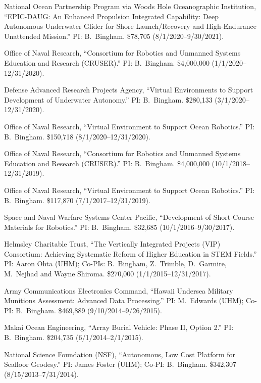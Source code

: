 
\begin{cvenum}
  \item National Ocean Partnership Program via Woods Hole Oceanographic Institution, ``EPIC-DAUG: An Enhanced Propulsion Integrated Capability: Deep Autonomous Underwater Glider for Shore Launch/Recovery and High-Endurance Unattended Mission.'' PI: B.\ Bingham. \$78,705 (8/1/2020--9/30/2021).
  \item Office of Naval Research, ``Consortium for Robotics and Unmanned Systems Education and Research (CRUSER).'' PI: B.\ Bingham. \$4,000,000 (1/1/2020--12/31/2020).
  \item Defense Advanced Research Projects Agency, ``Virtual Environments to Support Development of Underwater Autonomy.'' PI: B.\ Bingham. \$280,133 (3/1/2020--12/31/2020).
  \item Office of Naval Research, ``Virtual Environment to Support Ocean Robotics.'' PI: B.\ Bingham. \$150,718 (8/1/2020--12/31/2020).
  \item Office of Naval Research, ``Consortium for Robotics and Unmanned Systems Education and Research (CRUSER).'' PI: B.\ Bingham. \$4,000,000 (10/1/2018--12/31/2019).
  \item Office of Naval Research, ``Virtual Environment to Support Ocean Robotics.'' PI: B.\ Bingham. \$117,870 (7/1/2017--12/31/2019).
  \item Space and Naval Warfare Systems Center Pacific, ``Development of Short-Course Materials for Robotics.'' PI: B.\ Bingham. \$32,685 (10/1/2016--9/30/2017).
  \item Helmsley Charitable Trust, ``The Vertically Integrated Projects (VIP) Consortium: Achieving Systematic Reform of Higher Education in STEM Fields.'' PI: Aaron Ohta (UHM); Co-PIs: B.\ Bingham, Z.\ Trimble, D.\ Garmire, M.\ Nejhad and Wayne Shiroma. \$270,000 (1/1/2015--12/31/2017).
  \item Army Communications Electronics Command, ``Hawaii Undersea Military Munitions Assessment: Advanced Data Processing.'' PI: M.\ Edwards (UHM); Co-PI: B.\ Bingham. \$469,889 (9/10/2014--9/26/2015).
  \item Makai Ocean Engineering, ``Array Burial Vehicle: Phase II, Option 2.'' PI: B.\ Bingham. \$204,735 (6/1/2014--2/1/2015).
  \item National Science Foundation (NSF), ``Autonomous, Low Cost Platform for Seafloor Geodesy.'' PI: James Foster (UHM); Co-PI: B.\ Bingham. \$342,307 (8/15/2013--7/31/2014).

\end{cvenum}
